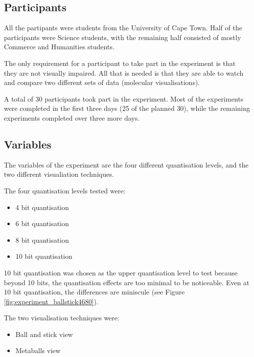 
\subsection{Participants}
\label{sub:experiment_participants}

All the partipants were students from the University of Cape Town. Half of the
participants were Science students, with the remaining half consisted of mostly
Commerce and Humanities students.

The only requirement for a participant to take part in the experiment is that
they are not visually impaired. All that is needed is that they are able to
watch and compare two different sets of data (molecular visualisations).

A total of 30 participants took part in the experiment. Most of the experiments
were completed in the first three days (25 of the planned 30), while the
remaining experiments completed over three more days.


\subsection{Variables}
\label{sub:experiment_variables}

The variables of the experiment are the four different quantisation levels, and
the two different visualiation techniques.

The four quantisation levels tested were:
\begin{itemize}
  \item 4 bit quantisation
  \item 6 bit quantisation
  \item 8 bit quantisation
  \item 10 bit quantisation
\end{itemize}

10 bit quantisation was chosen as the upper quantisation level to test because
beyond 10 bits, the quantisation effects are too minimal to be noticeable. Even
at 10 bit quantisation, the differences are miniscule (see Figure
\ref{fig:experiment_ballstick4680}).

The two visualisation techniques were:
\begin{itemize}
  \item Ball and stick view
  \item Metaballs view
\end{itemize}

